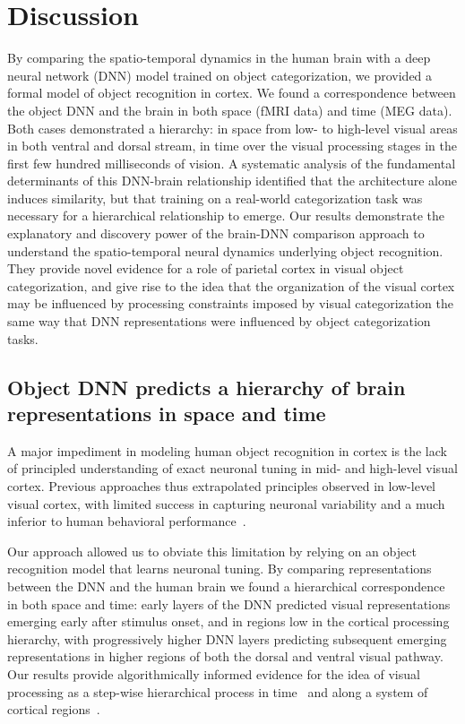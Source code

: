 \documentclass[10pt,twocolumn,letterpaper]{article}
\begin{document}
\section{Discussion}
By comparing the spatio-temporal dynamics in the human brain with a deep neural network (DNN) model trained on object categorization, we provided a formal model of object recognition in cortex. We found a correspondence between the object DNN and the brain in both space (fMRI data) and time (MEG data). Both cases demonstrated a hierarchy: in space from low- to high-level visual areas in both ventral and dorsal stream, in time over the visual processing stages in the first few hundred milliseconds of vision. A systematic analysis of the fundamental determinants of this DNN-brain relationship identified that the architecture alone induces similarity, but that training on a real-world categorization task was necessary for a hierarchical relationship to emerge. Our results demonstrate the explanatory and discovery power of the brain-DNN comparison approach to understand the spatio-temporal neural dynamics underlying object recognition. They provide novel evidence for a role of parietal cortex in visual object categorization, and give rise to the idea that the organization of the visual cortex may be influenced by processing constraints imposed by visual categorization the same way that DNN representations were influenced by object categorization tasks.

\subsection{Object DNN predicts a hierarchy of brain representations in space and time}
A major impediment in modeling human object recognition in cortex is the lack of principled understanding of exact neuronal tuning in mid- and high-level visual cortex. Previous approaches thus extrapolated principles observed in low-level visual cortex, with limited success in capturing neuronal variability and a much inferior to human behavioral performance~\cite{riesenhuber1999hierarchical,riesenhuber2002neural}.

Our approach allowed us to obviate this limitation by relying on an object recognition model that learns neuronal tuning. By comparing representations between the DNN and the human brain we found a hierarchical correspondence in both space and time: early layers of the DNN predicted visual representations emerging early after stimulus onset, and in regions low in the cortical processing hierarchy, with progressively higher DNN layers predicting subsequent emerging representations in higher regions of both the dorsal and ventral visual pathway. Our results provide algorithmically informed evidence for the idea of visual processing as a step-wise hierarchical process in time~\cite{bullier2001integrated,cichy2014resolving,mormann2008latency} and along a system of cortical regions~\cite{felleman1991distributed,dicarlo2012does,freiwald2009face}.
\end{document}
